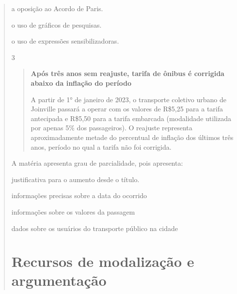 \begin{quote}
\begin{escolha}
  \item a oposição ao Acordo de Paris.
  
  \item o uso de gráficos de pesquisas.
  
  \item o uso de expressões sensibilizadoras.

\end{escolha}


\num{3}

\begin{quote}

\textbf{Após três anos sem reajuste, tarifa de ônibus é corrigida abaixo da
inflação do período}

A partir de 1° de janeiro de 2023, o transporte coletivo urbano de
Joinville passará a operar com os valores de R\$5,25 para a tarifa
antecipada e R\$5,50 para a tarifa embarcada (modalidade utilizada por
apenas 5\% dos passageiros). O reajuste representa aproximadamente
metade do percentual de inflação dos últimos três anos, período no qual
a tarifa não foi corrigida.

\end{quote}


A matéria apresenta grau de parcialidade, pois apresenta:

\begin{escolha}
  
  \item justificativa para o aumento desde o título.
  
  \item informações precisas sobre a data do ocorrido
  
  \item informações sobre os valores da passagem
  
  \item dados sobre os usuários do transporte público na cidade

\end{escolha}


\chapter{Recursos de modalização e argumentação}


\end{quote}
